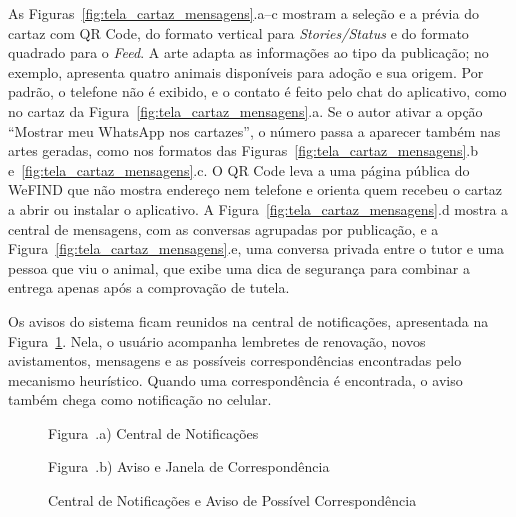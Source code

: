 As Figuras~\ref{fig:tela_cartaz_mensagens}.a--c mostram a seleção e a prévia do cartaz com QR Code, do formato vertical para \textit{Stories/Status} e do formato quadrado para o \textit{Feed}. A arte adapta as informações ao tipo da publicação; no exemplo, apresenta quatro animais disponíveis para adoção e sua origem. Por padrão, o telefone não é exibido, e o contato é feito pelo chat do aplicativo, como no cartaz da Figura~\ref{fig:tela_cartaz_mensagens}.a. Se o autor ativar a opção ``Mostrar meu WhatsApp nos cartazes'', o número passa a aparecer também nas artes geradas, como nos formatos das Figuras~\ref{fig:tela_cartaz_mensagens}.b e~\ref{fig:tela_cartaz_mensagens}.c. O QR Code leva a uma página pública do WeFIND que não mostra endereço nem telefone e orienta quem recebeu o cartaz a abrir ou instalar o aplicativo. A Figura~\ref{fig:tela_cartaz_mensagens}.d mostra a central de mensagens, com as conversas agrupadas por publicação, e a Figura~\ref{fig:tela_cartaz_mensagens}.e, uma conversa privada entre o tutor e uma pessoa que viu o animal, que exibe uma dica de segurança para combinar a entrega apenas após a comprovação de tutela.

Os avisos do sistema ficam reunidos na central de notificações, apresentada na Figura~\ref{fig:tela_notificacoes}. Nela, o usuário acompanha lembretes de renovação, novos avistamentos, mensagens e as possíveis correspondências encontradas pelo mecanismo heurístico. Quando uma correspondência é encontrada, o aviso também chega como notificação no celular.

\begin{figure}[H]
    \centering
    \caption{Central de Notificações e Aviso de Possível Correspondência}
    \label{fig:tela_notificacoes}
    \vspace{0.15cm}
    \begin{minipage}[t]{0.48\textwidth}
        \centering
        \par\vspace{0.15cm}
        {\small Figura~\thefigure.a) Central de Notificações}
    \end{minipage}
    \hfill
    \begin{minipage}[t]{0.48\textwidth}
        \centering
        \par\vspace{0.15cm}
        {\small Figura~\thefigure.b) Aviso e Janela de Correspondência}
    \end{minipage}
    \par\vspace{0.12cm}
\end{figure}


